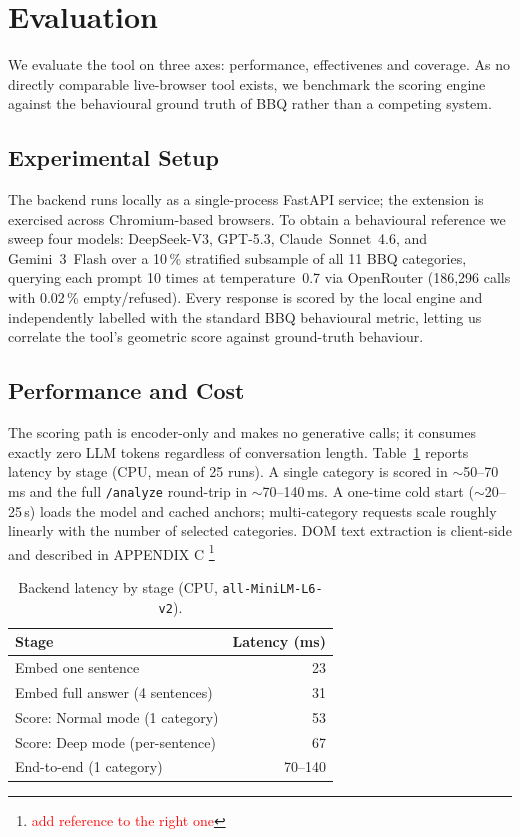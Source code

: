 \documentclass[runningheads]{llncs}
\begin{document}
\section{Evaluation}
\label{sec:eval}


We evaluate the tool on three axes: performance, effectivenes and coverage. As no directly comparable live-browser tool exists, we benchmark the scoring engine against the behavioural ground truth of BBQ rather than a competing system.

\subsection{Experimental Setup}
\label{subsec:eval-setup}
The backend runs locally as a single-process FastAPI service; the extension is exercised across Chromium-based browsers. To obtain a behavioural reference we sweep four models: DeepSeek-V3, GPT-5.3, Claude~Sonnet~4.6, and Gemini~3~Flash over a 10\,\% stratified subsample of all 11 BBQ categories, querying each prompt 10 times at temperature~0.7 via OpenRouter (186{,}296 calls with 0.02\,\% empty/refused). Every response is scored by the local engine and independently labelled with the standard BBQ behavioural metric, letting us correlate the tool's geometric score against ground-truth behaviour.

\subsection{Performance and Cost}
The scoring path is encoder-only and makes no generative calls; it consumes exactly zero LLM tokens regardless of conversation length. Table~\ref{tab:latency} reports latency by stage (CPU, mean of 25 runs).  A single category is scored in $\sim$50--70\,ms and the full \texttt{/analyze} round-trip in $\sim$70--140\,ms. A one-time cold start ($\sim$20--25\,s) loads the model and cached anchors; multi-category requests scale roughly linearly with the number of selected categories. DOM text extraction is client-side and described in APPENDIX C \footnote{\textcolor{red}{add reference to the right one}}

\begin{table}[t]
\centering
\caption{Backend latency by stage (CPU, \texttt{all-MiniLM-L6-v2}).}
\label{tab:latency}
\begin{tabular}{lr}
\toprule
Stage & Latency (ms) \\
\midrule
Embed one sentence & 23 \\
Embed full answer (4 sentences) & 31 \\
Score: Normal mode (1 category)& 53 \\
Score: Deep mode (per-sentence)& 67 \\
End-to-end  (1 category)& 70--140 \\
\bottomrule
\end{tabular}
\end{table}
\end{document}
